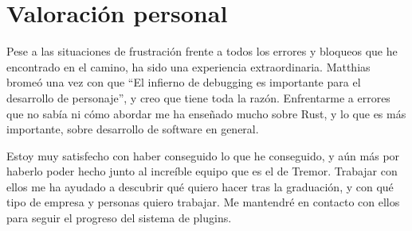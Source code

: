 \section{Valoración personal}

Pese a las situaciones de frustración frente a todos los errores y bloqueos que
he encontrado en el camino, ha sido una experiencia extraordinaria. Matthias
bromeó una vez con que ``El infierno de debugging es importante para el
desarrollo de personaje'', y creo que tiene toda la razón. Enfrentarme a errores
que no sabía ni cómo abordar me ha enseñado mucho sobre Rust, y lo que es más
importante, sobre desarrollo de software en general.

Estoy muy satisfecho con haber conseguido lo que he conseguido, y aún más por
haberlo poder hecho junto al increíble equipo que es el de Tremor. Trabajar con
ellos me ha ayudado a descubrir qué quiero hacer tras la graduación, y con qué
tipo de empresa y personas quiero trabajar. Me mantendré en contacto con ellos
para seguir el progreso del sistema de plugins.
